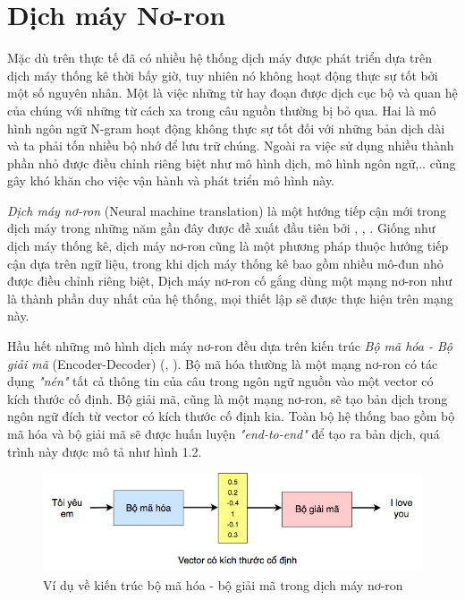\section{Dịch máy Nơ-ron}

Mặc dù trên thực tế đã có nhiều hệ thống dịch máy được phát triển dựa trên dịch máy thống kê thời bấy giờ, tuy nhiên nó không hoạt động thực sự tốt bởi một số nguyên nhân. Một là việc những từ hay đoạn được dịch cục bộ và quan hệ của chúng với những từ cách xa trong câu nguồn thường bị bỏ qua. Hai là mô hình ngôn ngữ N-gram hoạt động không thực sự tốt đối với những bản dịch dài và ta phải tốn nhiều bộ nhớ để lưu trữ chúng. Ngoài ra việc sử dụng nhiều thành phần nhỏ được điều chỉnh riêng biệt như mô hình dịch, mô hình ngôn ngữ,.. cũng gây khó khăn cho việc vận hành và phát triển mô hình này.

\textit{Dịch máy nơ-ron} (Neural machine translation) là một hướng tiếp cận mới trong dịch máy trong những năm gần đây được đề xuất đầu tiên bởi \cite{kalchbrennerBlunsom}, \cite{sutskever}, \cite{cho}. Giống như dịch máy thống kê, dịch máy nơ-ron cũng là một phương pháp thuộc hướng tiếp cận dựa trên ngữ liệu, trong khi dịch máy thống kê bao gồm nhiều mô-đun nhỏ được điều chỉnh riêng biệt, Dịch máy nơ-ron cố gắng dùng một mạng nơ-ron như là thành phần duy nhất của hệ thống, mọi thiết lập sẽ được thực hiện trên mạng này. 

Hầu hết những mô hình dịch máy nơ-ron đều dựa trên kiến trúc \textit{Bộ mã hóa - Bộ giải mã} (Encoder-Decoder) (\cite{sutskever}, \cite{cho}). Bộ mã hóa thường là một mạng nơ-ron có tác dụng \textit{"nén"} tất cả thông tin của câu trong ngôn ngữ nguồn vào một vector có kích thước cố định. Bộ giải mã, cũng là một mạng nơ-ron, sẽ tạo bản dịch trong ngôn ngữ đích từ vector có kích thước cố định kia. Toàn bộ hệ thống bao gồm bộ mã hóa và bộ giải mã sẽ được huấn luyện \textit{"end-to-end"} để tạo ra bản dịch, quá trình này được mô tả như hình 1.2.

\begin{figure}
	\centering
	\includegraphics[width=\textwidth]{intro2nmt}
	\caption[Ví dụ về Kiến trúc \textit{bộ mã hóa - bộ giải mã} trong dịch máy nơ-ron]{Ví dụ về kiến trúc bộ mã hóa - bộ giải mã trong dịch máy nơ-ron}
	\label{fig_encoder_decoder}
\end{figure}


